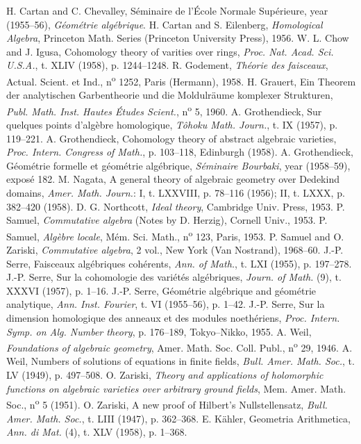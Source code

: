 
\label{bib-section}

\renewcommand\refname{Bibliography}
\begin{thebibliography}{22}
H. Cartan and C. Chevalley,
S{\'e}minaire de l'{\'E}cole Normale Sup{\'e}rieure,
 year (1955--56),
\emph{G{\'e}om{\'e}trie alg{\'e}brique}.
H. Cartan and S. Eilenberg,
\emph{Homological Algebra},
Princeton Math. Series (Princeton University Press),
1956.
W. L. Chow and J. Igusa,
Cohomology theory of varities over rings,
\emph{Proc. Nat. Acad. Sci. U.S.A.},
t. XLIV (1958),
p. 1244--1248.
R. Godement,
\emph{Th{\'e}orie des faisceaux},
Actual. Scient. et Ind.,
n\textsuperscript{o} 1252,
Paris (Hermann),
1958.
H. Grauert,
Ein Theorem der analytischen Garbentheorie und die Moldulr{\"a}ume komplexer Strukturen,
\emph{Publ. Math. Inst. Hautes {\'E}tudes Scient.},
n\textsuperscript{o} 5,
1960.
A. Grothendieck,
Sur quelques points d'alg{\`e}bre homologique,
\emph{T{\^o}hoku Math. Journ.},
t. IX (1957),
p. 119--221.
A. Grothendieck,
Cohomology theory of abstract algebraic varieties,
\emph{Proc. Intern. Congress of Math.},
p. 103--118,
Edinburgh (1958).
A. Grothendieck,
G{\'e}om{\'e}trie formelle et g{\'e}om{\'e}trie alg{\'e}brique,
\emph{S{\'e}minaire Bourbaki},
 year (1958--59),
expos{\'e} 182.
M. Nagata,
A general theory of algebraic geometry over Dedekind domains,
\emph{Amer. Math. Journ.}:
I,
t. LXXVIII,
p. 78--116 (1956);
II,
t. LXXX,
p. 382--420 (1958).
D. G. Northcott,
\emph{Ideal theory},
Cambridge Univ. Press,
1953.
P. Samuel,
\emph{Commutative algebra} (Notes by D. Herzig),
Cornell Univ.,
1953.
P. Samuel,
\emph{Alg{\`e}bre locale},
M{\'e}m. Sci. Math.,
n\textsuperscript{o} 123,
Paris,
1953.
P. Samuel and O. Zariski,
\emph{Commutative algebra},
2 vol.,
New York (Van Nostrand),
1968--60.
J.-P. Serre,
Faisceaux alg{\'e}briques coh{\'e}rents,
\emph{Ann. of Math.},
t. LXI (1955),
p. 197--278.
J.-P. Serre,
Sur la cohomologie des vari{\'e}t{\'e}s alg{\'e}briques,
\emph{Journ. of Math.} (9),
t. XXXVI (1957),
p. 1--16.
J.-P. Serre,
G{\'e}om{\'e}trie alg{\'e}brique and g{\'e}om{\'e}trie analytique,
\emph{Ann. Inst. Fourier},
t. VI (1955--56),
p. 1--42.
J.-P. Serre,
Sur la dimension homologique des anneaux et des modules noeth{\'e}riens,
\emph{Proc. Intern. Symp. on Alg. Number theory},
p. 176--189,
Tokyo--Nikko,
1955.
A. Weil,
\emph{Foundations of algebraic geometry},
Amer. Math. Soc. Coll. Publ.,
n\textsuperscript{o} 29,
1946.
A. Weil,
Numbers of solutions of equations in finite fields,
\emph{Bull. Amer. Math. Soc.},
t. LV (1949),
p. 497--508.
O. Zariski,
\emph{Theory and applications of holomorphic functions on algebraic varieties over arbitrary ground fields},
Mem. Amer. Math. Soc.,
n\textsuperscript{o} 5 (1951).
O. Zariski,
A new proof of Hilbert's Nullstellensatz,
\emph{Bull. Amer. Math. Soc.},
t. LIII (1947),
p. 362--368.
E. K{\"a}hler,
Geometria Arithmetica,
\emph{Ann. di Mat.} (4),
t. XLV (1958),
p. 1--368.
\end{thebibliography}

